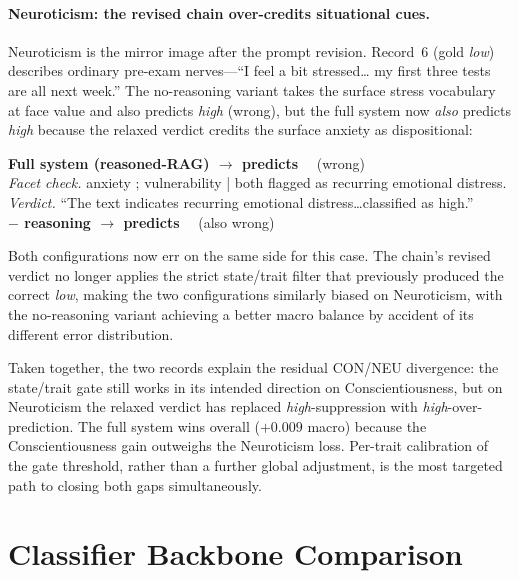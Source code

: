 \documentclass[../main.tex]{subfiles}
\begin{document}
\paragraph{Neuroticism: the revised chain over-credits situational cues.}
Neuroticism is the mirror image after the prompt revision. Record~6 (gold
\textit{low}) describes ordinary pre-exam nerves---``I feel a bit stressed\dots
my first three tests are all next week.'' The no-reasoning variant takes the
surface stress vocabulary at face value and also predicts \textit{high} (wrong),
but the full system now \emph{also} predicts \textit{high} because the relaxed
verdict credits the surface anxiety as dispositional:
%
\begin{llmbox}[title={Record 6 -- Neuroticism (gold: low)}]
\textbf{Full system (reasoned-RAG) $\rightarrow$ predicts } ~~(wrong)\\
\textit{Facet check.} anxiety ; vulnerability  | both flagged as recurring emotional distress.\\
\textit{Verdict.} ``The text indicates recurring emotional distress\dots classified as high.''\\[4pt]
\textbf{$-$ reasoning $\rightarrow$ predicts } ~~(also wrong)
\end{llmbox}
%
Both configurations now err on the same side for this case. The chain's revised
verdict no longer applies the strict state/trait filter that previously produced
the correct \textit{low}, making the two configurations similarly biased on
Neuroticism, with the no-reasoning variant achieving a better macro balance
by accident of its different error distribution.

Taken together, the two records explain the residual CON/NEU divergence: the
state/trait gate still works in its intended direction on Conscientiousness,
but on Neuroticism the relaxed verdict has replaced \textit{high}-suppression
with \textit{high}-over-prediction. The full system wins overall ($+0.009$
macro) because the Conscientiousness gain outweighs the Neuroticism loss.
Per-trait calibration of the gate threshold, rather than a further global
adjustment, is the most targeted path to closing both gaps simultaneously.

\section{Classifier Backbone Comparison}
\label{sec:model-comparison}
\end{document}

